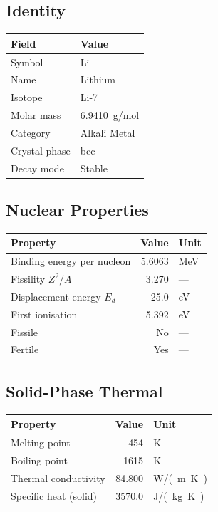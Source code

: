 \documentclass[11pt,a4paper]{article}
\begin{document}
\subsection{Identity}
\begin{tabular}{ll}
  \toprule
  Field & Value \\
  \midrule
  Symbol & Li \\
  Name & Lithium \\
  Isotope & Li-7 \\
  Molar mass & \SI{6.9410}{g/mol} \\
  Category & Alkali Metal \\
  Crystal phase & bcc \\
  Decay mode & Stable \\
  \bottomrule
\end{tabular}

\subsection{Nuclear Properties}
\begin{tabular}{lrl}
  \toprule
  Property & Value & Unit \\
  \midrule
  Binding energy per nucleon & 5.6063 & \si{MeV} \\
  Fissility $Z^2/A$ & 3.270 & --- \\
  Displacement energy $E_d$ & 25.0 & \si{eV} \\
  First ionisation & 5.392 & \si{eV} \\
  Fissile & No & --- \\
  Fertile & Yes & --- \\
  \bottomrule
\end{tabular}

\subsection{Solid-Phase Thermal}
\begin{tabular}{lrl}
  \toprule
  Property & Value & Unit \\
  \midrule
  Melting point & 454 & \si{K} \\
  Boiling point & 1615 & \si{K} \\
  Thermal conductivity & 84.800 & \si{W/(m.K)} \\
  Specific heat (solid) & 3570.0 & \si{J/(kg.K)} \\
  \bottomrule
\end{tabular}
\end{document}
